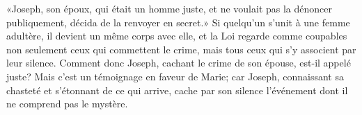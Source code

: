 «Joseph, son époux, qui était un homme juste,
	et ne voulait pas la dénoncer publiquement,
	décida de la renvoyer en secret.»
Si quelqu’un s’unit à une femme adultère, il devient un même corps avec elle,
	et la Loi regarde comme coupables
	non seulement ceux qui commettent le crime,
	mais tous ceux qui s’y associent par leur silence.
Comment donc Joseph, cachant le crime de son épouse, est-il appelé juste?
Mais c’est un témoignage en faveur de Marie;
	car Joseph, connaissant sa chasteté et s’étonnant de ce qui arrive,
	cache par son silence l’événement dont il ne comprend pas le mystère.
